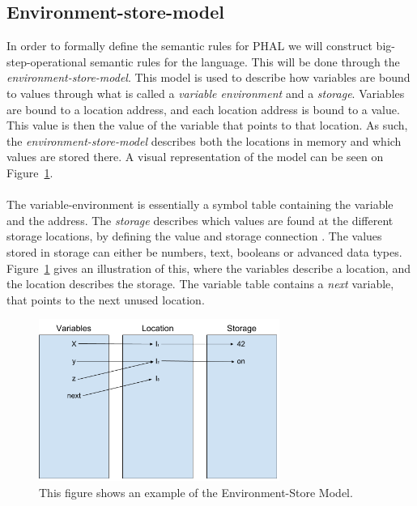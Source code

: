 \subsection{Environment-store-model}\label{semantics:EnvStore}
In order to formally define the semantic rules for PHAL we will construct big-step-operational semantic rules for the language. 
This will be done through the \textit{environment-store-model}. This model is used to describe how variables are bound to values through what is called a \textit{variable environment} and a \textit{storage}. 
Variables are bound to a location address, and each location address is bound to a value. 
This value is then the value of the variable that points to that location. 
As such, the \textit{environment-store-model} describes both the locations in memory and which values are stored there.
A visual representation of the model can be seen on Figure~\ref{fig:ESModel}.
\\\\
The variable-environment is essentially a symbol table containing the variable and the address. 
The \textit{storage} describes which values are found at the different storage locations, by defining the value and storage connection \cite{PilenVedTraeetsRod}. 
The values stored in storage can either be numbers, text, booleans or advanced data types.
\\
Figure~\ref{fig:ESModel} gives an illustration of this, where the variables describe a location, and the location describes the storage. 
The variable table contains a \textit{next} variable, that points to the next unused location. 
\begin{figure}[H]
\centering
  \includegraphics[width=0.7\textwidth]{figures/semantics/1.png}
  \caption{This figure shows an example of the Environment-Store Model.}
  \label{fig:ESModel}
\end{figure}


